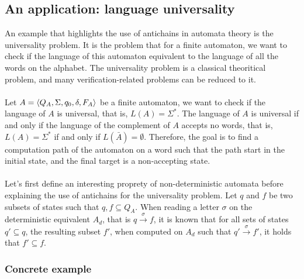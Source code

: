 \documentclass[11pt,a4paper]{article}
\DeclarePairedDelimiter{\tuple}{\langle}{\rangle}
\theoremstyle{definition}
\begin{document}
\subsection{An application: language universality}

An example that highlights the use of antichains in automata theory is
the universality problem.
It is the problem that for a finite automaton, we want to
check if the language of this automaton equivalent to the language
of all the words on the alphabet. The universality problem is a classical
theoritical problem, and many verification-related problems can be
reduced to it.

\paragraph{}

Let $A=\tuple{Q_A, \Sigma, q_0, \delta, F_A}$ be a finite automaton,
we want to check if
the language of $A$ is universal, that is, $L(A) = \Sigma^*$.
The language of $A$ is universal if and only if the language
of the complement of $A$ accepts no words, that is,
$L(A) = \Sigma^*$ if and only if $L(\bar{A}) = \emptyset$.
Therefore, the goal is to find a computation path of the
automaton on a word such that the path start in the initial state,
and the final target is a non-accepting state.

\paragraph{}

Let's first define an interesting proprety of non-deterministic automata
before explaining the use of antichains for the universality problem.
Let $q$ and $f$ be two subsets of states such that $q, f \subseteq Q_A$.
When reading a letter $\sigma$ on the deterministic equivalent
$A_d$, that is $q \xrightarrow{\sigma} f$, it is known that
for all sets of states $q' \subseteq q$, the resulting subset
$f'$, when computed on $A_d$ such that $q' \xrightarrow{\sigma} f'$,
it holds that $f' \subseteq f$.

\subsubsection{Concrete example}

\paragraph{}
\end{document}
